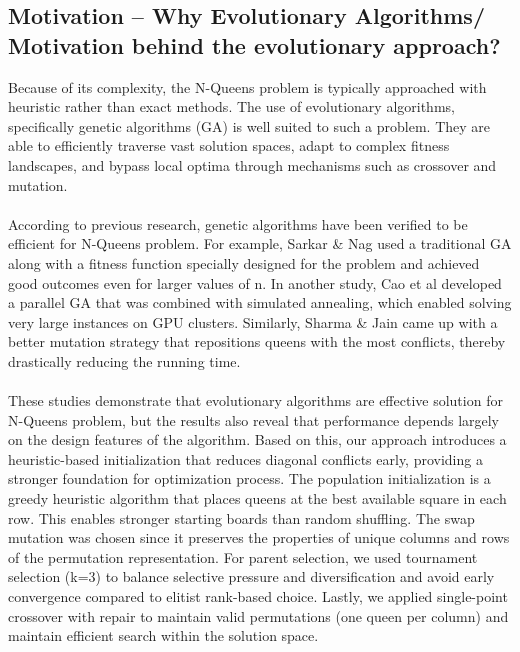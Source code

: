 \documentclass{scrartcl}
\begin{document}
\subsection*{Motivation – Why Evolutionary Algorithms/ Motivation behind the evolutionary approach?}
Because of its complexity, the N-Queens problem is typically approached with heuristic rather than exact methods. The use of evolutionary algorithms, specifically genetic algorithms (GA) is well suited to such a problem. They are able to efficiently traverse vast solution spaces, adapt to complex fitness landscapes, and bypass local optima through mechanisms such as crossover and mutation. \\ \\ According to previous research, genetic algorithms have been verified to be efficient for N-Queens problem. For example, Sarkar \& Nag \cite{sarkar2018nqueens} used a traditional GA along with a fitness function specially designed for the problem and achieved good outcomes even for larger values of n. In another study, Cao et al \cite{cao2020parallel} developed a parallel GA that was combined with simulated annealing, which enabled solving very large instances on GPU clusters. Similarly, Sharma \& Jain \cite{sharma2021novelMutation} came up with a better mutation strategy that repositions queens with the most conflicts, thereby drastically reducing the running time. \\ \\ These studies demonstrate that evolutionary algorithms are effective solution for N-Queens problem, but the results also reveal that performance depends largely on the design features of the algorithm. Based on this, our approach introduces a heuristic-based initialization that reduces diagonal conflicts early, providing a stronger foundation for optimization process. The population initialization is a greedy heuristic algorithm that places queens at the best available square in each row. This enables stronger starting boards than random shuffling. The swap mutation was chosen since it preserves the properties of unique columns and rows of the permutation representation. For parent selection, we used tournament selection (k=3) to balance selective pressure and diversification and avoid early convergence compared to elitist rank-based choice. Lastly, we applied single-point crossover with repair to maintain valid permutations (one queen per column) and maintain efficient search within the solution space. 
\end{document}
